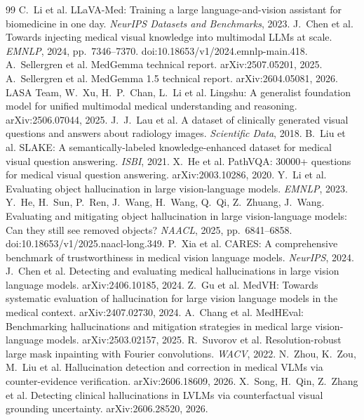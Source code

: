 \documentclass[11pt]{article}
\begin{document}
\begin{thebibliography}{99}\small
{} C.~Li et al. LLaVA-Med: Training a large language-and-vision assistant for biomedicine in one day. \emph{NeurIPS Datasets and Benchmarks}, 2023.
 J.~Chen et al. Towards injecting medical visual knowledge into multimodal LLMs at scale. \emph{EMNLP}, 2024, pp.~7346--7370. doi:10.18653/v1/2024.emnlp-main.418.
 A.~Sellergren et al. MedGemma technical report. arXiv:2507.05201, 2025.
 A.~Sellergren et al. MedGemma 1.5 technical report. arXiv:2604.05081, 2026.
 LASA Team, W.~Xu, H.~P.~Chan, L.~Li et al. Lingshu: A generalist foundation model for unified multimodal medical understanding and reasoning. arXiv:2506.07044, 2025.
 J.~J.~Lau et al. A dataset of clinically generated visual questions and answers about radiology images. \emph{Scientific Data}, 2018.
 B.~Liu et al. SLAKE: A semantically-labeled knowledge-enhanced dataset for medical visual question answering. \emph{ISBI}, 2021.
 X.~He et al. PathVQA: 30000+ questions for medical visual question answering. arXiv:2003.10286, 2020.
 Y.~Li et al. Evaluating object hallucination in large vision-language models. \emph{EMNLP}, 2023.
 Y.~He, H.~Sun, P.~Ren, J.~Wang, H.~Wang, Q.~Qi, Z.~Zhuang, J.~Wang. Evaluating and mitigating object hallucination in large vision-language models: Can they still see removed objects? \emph{NAACL}, 2025, pp.~6841--6858. doi:10.18653/v1/2025.naacl-long.349.
 P.~Xia et al. CARES: A comprehensive benchmark of trustworthiness in medical vision language models. \emph{NeurIPS}, 2024.
 J.~Chen et al. Detecting and evaluating medical hallucinations in large vision language models. arXiv:2406.10185, 2024.
 Z.~Gu et al. MedVH: Towards systematic evaluation of hallucination for large vision language models in the medical context. arXiv:2407.02730, 2024.
 A.~Chang et al. MedHEval: Benchmarking hallucinations and mitigation strategies in medical large vision-language models. arXiv:2503.02157, 2025.
 R.~Suvorov et al. Resolution-robust large mask inpainting with Fourier convolutions. \emph{WACV}, 2022.
 N.~Zhou, K.~Zou, M.~Liu et al. Hallucination detection and correction in medical VLMs via counter-evidence verification. arXiv:2606.18609, 2026.
 X.~Song, H.~Qin, Z.~Zhang et al. Detecting clinical hallucinations in LVLMs via counterfactual visual grounding uncertainty. arXiv:2606.28520, 2026.

\end{thebibliography}
\end{document}
